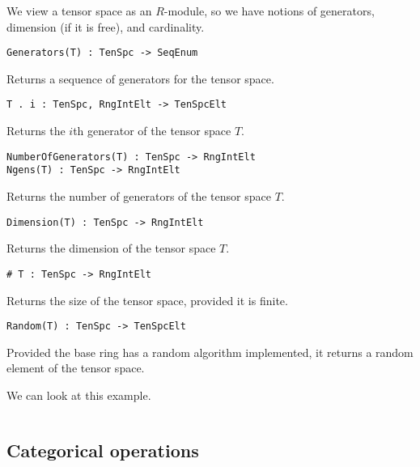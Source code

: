 \documentclass{amsart}
\begin{document}
We view a tensor space as an $R$-module, so we have notions of generators, 
dimension (if it is free), and cardinality.

\color{blue}
{\small \begin{verbatim}
Generators(T) : TenSpc -> SeqEnum
\end{verbatim} }
\color{black}

Returns a sequence of generators for the tensor space. 

\color{blue}
{\small \begin{verbatim}
T . i : TenSpc, RngIntElt -> TenSpcElt
\end{verbatim} }
\color{black}

Returns the $i$th generator of the tensor space $T$.

\color{blue}
{\small \begin{verbatim}
NumberOfGenerators(T) : TenSpc -> RngIntElt
Ngens(T) : TenSpc -> RngIntElt
\end{verbatim} }
\color{black}

Returns the number of generators of the tensor space $T$.

\color{blue}
{\small \begin{verbatim}
Dimension(T) : TenSpc -> RngIntElt
\end{verbatim} }
\color{black}

Returns the dimension of the tensor space $T$.

\color{blue}
\index{\#}
{\small \begin{verbatim}
# T : TenSpc -> RngIntElt
\end{verbatim} }
\color{black}

Returns the size of the tensor space, provided it is finite.

\color{blue}
{\small \begin{verbatim}
Random(T) : TenSpc -> TenSpcElt
\end{verbatim} }
\color{black}

Provided the base ring has a random algorithm implemented, it returns a random 
element of the tensor space.

We can look at this example.
{\small
\begin{lstlisting}[frame=single,basicstyle=\ttfamily\color{black!30!teal},backgroundcolor=\color{white!70!gray}]
\end{lstlisting}
}

\subsection{Categorical operations}
\end{document}
